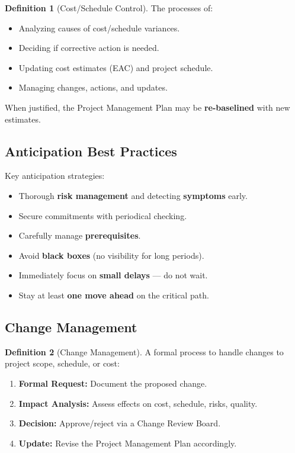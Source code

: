 \documentclass[11pt,a4paper]{article}
\theoremstyle{definition}
\newtheorem{definition}{Definition}[section]
\theoremstyle{plain}
\begin{document}
\begin{definition}[Cost/Schedule Control]
The processes of:
\begin{itemize}[nosep]
  \item Analyzing causes of cost/schedule variances.
  \item Deciding if corrective action is needed.
  \item Updating cost estimates (EAC) and project schedule.
  \item Managing changes, actions, and updates.
\end{itemize}
When justified, the Project Management Plan may be \textbf{re-baselined} with new estimates.
\end{definition}

\subsection{Anticipation Best Practices}

Key anticipation strategies:
\begin{itemize}[nosep]
  \item Thorough \textbf{risk management} and detecting \textbf{symptoms} early.
  \item Secure commitments with periodical checking.
  \item Carefully manage \textbf{prerequisites}.
  \item Avoid \textbf{black boxes} (no visibility for long periods).
  \item Immediately focus on \textbf{small delays} --- do not wait.
  \item Stay at least \textbf{one move ahead} on the critical path.
\end{itemize}

\subsection{Change Management}

\begin{definition}[Change Management]
A formal process to handle changes to project scope, schedule, or cost:
\begin{enumerate}[nosep, label=\arabic*.]
  \item \textbf{Formal Request:} Document the proposed change.
  \item \textbf{Impact Analysis:} Assess effects on cost, schedule, risks, quality.
  \item \textbf{Decision:} Approve/reject via a Change Review Board.
  \item \textbf{Update:} Revise the Project Management Plan accordingly.
\end{enumerate}
\end{definition}
\end{document}
